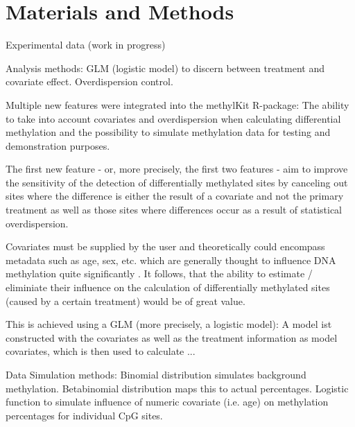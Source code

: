 \section{Materials and Methods}

Experimental data (work in progress)

Analysis methods: GLM (logistic model) to discern between treatment and covariate effect. 
Overdispersion control.

Multiple new features were integrated into the methylKit R-package: The ability to take into account covariates and overdispersion when calculating differential methylation and the possibility to simulate methylation data for testing and demonstration purposes.

The first new feature - or, more precisely, the first two features - aim to  improve the sensitivity of the detection of differentially methylated sites by canceling out sites where the difference is either the result of a covariate and not the primary treatment as well as those sites where differences occur as a result of statistical overdispersion.

Covariates must be supplied by the user and theoretically could encompass metadata such as age, sex, etc. which are generally thought to influence DNA methylation quite significantly \cite{24561809}. It follows, that the ability to estimate / eliminiate their influence on the calculation of differentially methylated sites (caused by a certain treatment) would be of great value.

This is achieved using a GLM (more precisely, a logistic model): A model ist constructed with the covariates as well as the treatment information as model covariates, which is then used to calculate ...

Data Simulation methods: Binomial distribution simulates background methylation. 
Betabinomial distribution maps this to actual percentages.
Logistic function to simulate influence of numeric covariate (i.e. age) on methylation percentages for individual CpG sites.
  
  
  
  
  